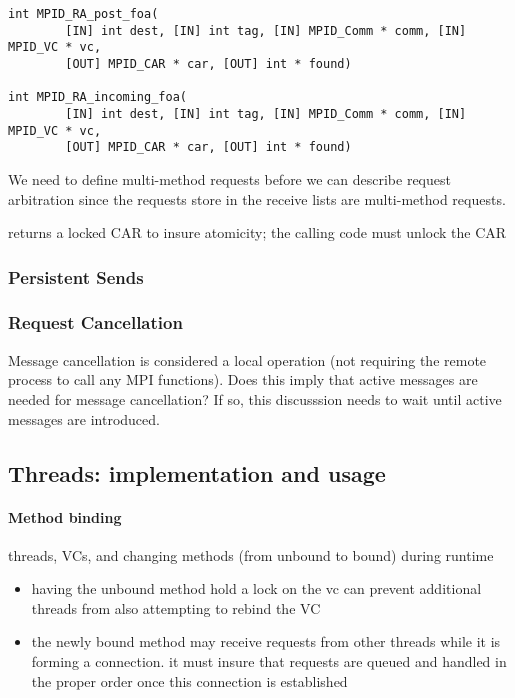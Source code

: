 \begin{verbatim}
int MPID_RA_post_foa(
        [IN] int dest, [IN] int tag, [IN] MPID_Comm * comm, [IN] MPID_VC * vc,
        [OUT] MPID_CAR * car, [OUT] int * found)

int MPID_RA_incoming_foa(
        [IN] int dest, [IN] int tag, [IN] MPID_Comm * comm, [IN] MPID_VC * vc,
        [OUT] MPID_CAR * car, [OUT] int * found)
\end{verbatim}

\begin{cmt}[BRT]
  We need to define multi-method requests before we can describe request
  arbitration since the requests store in the receive lists are multi-method
  requests.
\end{cmt}

 returns a locked CAR to insure atomicity; the calling
code must unlock the CAR

\subsubsection{Persistent Sends}

\subsubsection{Request Cancellation}

\begin{cmt}
  Message cancellation is considered a local operation (not requiring the
  remote process to call any MPI functions).  Does this imply that active
  messages are needed for message cancellation?  If so, this discusssion needs
  to wait until active messages are introduced.
\end{cmt}


\subsection{Threads: implementation and usage}

\paragraph{Method binding} threads, VCs, and changing methods (from unbound
to bound) during runtime
\begin{itemize}
\item having the unbound method hold a lock on the vc can prevent additional
  threads from also attempting to rebind the VC
\item the newly bound method may receive requests from other threads while it
  is forming a connection.  it must insure that requests are queued and handled
  in the proper order once this connection is established
\end{itemize}

